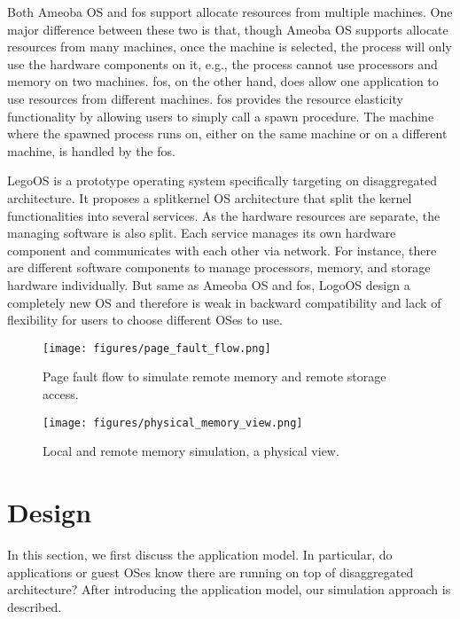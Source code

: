 \documentclass[twocolumn]{article}
\begin{document}
Both Ameoba OS and fos support allocate resources from multiple machines. One major difference between these two is that, though Ameoba OS supports allocate resources from many machines, once the machine is selected, the process will only use the hardware components on it, e.g., the process cannot use processors and memory on two machines. fos, on the other hand, does allow one application to use resources from different machines. fos provides the resource elasticity functionality by allowing users to simply call a spawn procedure. The machine where the spawned process runs on, either on the same machine or on a different machine, is handled by the fos.

LegoOS\cite{LegoOS} is a prototype operating system specifically targeting on disaggregated architecture. It proposes a splitkernel OS architecture that split the kernel functionalities into several services. As the hardware resources are separate, the managing software is also split. Each service manages its own hardware component and communicates with each other via network. For instance, there are different software components to manage processors, memory, and storage hardware individually. But same as Ameoba OS and fos, LogoOS design a completely new OS and therefore is weak in backward compatibility and lack of flexibility for users to choose different OSes to use.

\begin{figure*}[h!]
     \centering
     \texttt{[image: figures/page\_fault\_flow.png]}
     \caption{Page fault flow to simulate remote memory and remote storage access.}
     \label{fig:page fault flow}
\end{figure*}

\begin{figure*}[h!]
     \centering
     \texttt{[image: figures/physical\_memory\_view.png]}
     \caption{Local and remote memory simulation, a physical view.}
     \label{fig:physical memory view}
\end{figure*}

\section{Design}
In this section, we first discuss the application model. In particular, do applications or guest OSes know there are running on top of disaggregated architecture? After introducing the application model, our simulation approach is described.
\end{document}
